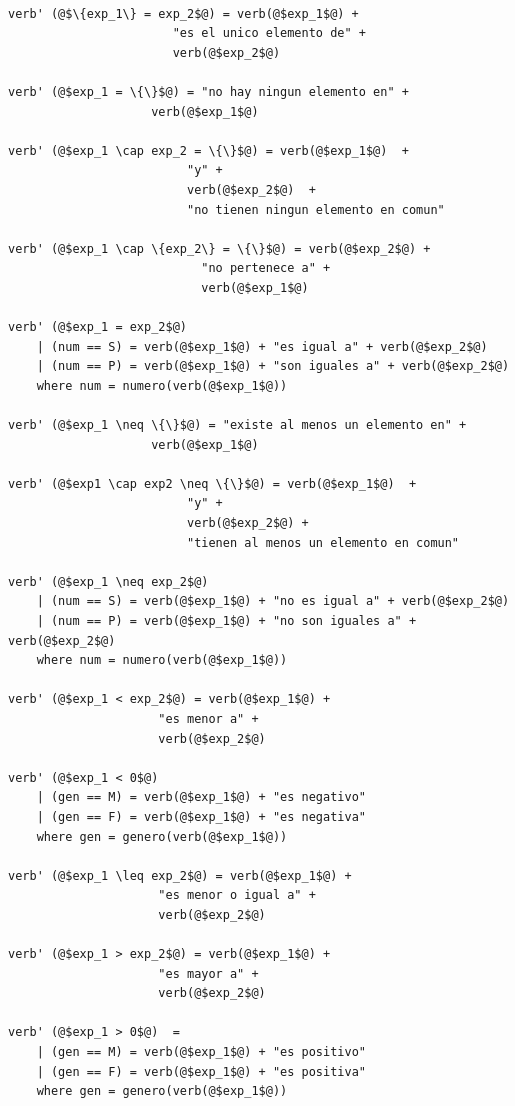 \begin{mdframed}[style=codebox]
\begin{verbatim}

verb' (@$\{exp_1\} = exp_2$@) = verb(@$exp_1$@) + 
                       "es el unico elemento de" + 
                       verb(@$exp_2$@)

verb' (@$exp_1 = \{\}$@) = "no hay ningun elemento en" + 
                    verb(@$exp_1$@) 

verb' (@$exp_1 \cap exp_2 = \{\}$@) = verb(@$exp_1$@)  +  
                         "y" +  
                         verb(@$exp_2$@)  +  
                         "no tienen ningun elemento en comun"

verb' (@$exp_1 \cap \{exp_2\} = \{\}$@) = verb(@$exp_2$@) +  
                           "no pertenece a" +  
                           verb(@$exp_1$@) 

verb' (@$exp_1 = exp_2$@)
    | (num == S) = verb(@$exp_1$@) + "es igual a" + verb(@$exp_2$@) 
    | (num == P) = verb(@$exp_1$@) + "son iguales a" + verb(@$exp_2$@) 
    where num = numero(verb(@$exp_1$@))

verb' (@$exp_1 \neq \{\}$@) = "existe al menos un elemento en" +  
                    verb(@$exp_1$@) 

verb' (@$exp1 \cap exp2 \neq \{\}$@) = verb(@$exp_1$@)  +  
                         "y" +  
                         verb(@$exp_2$@) +  
                         "tienen al menos un elemento en comun" 

verb' (@$exp_1 \neq exp_2$@)
    | (num == S) = verb(@$exp_1$@) + "no es igual a" + verb(@$exp_2$@) 
    | (num == P) = verb(@$exp_1$@) + "no son iguales a" + verb(@$exp_2$@) 
    where num = numero(verb(@$exp_1$@))

verb' (@$exp_1 < exp_2$@) = verb(@$exp_1$@) +  
                     "es menor a" +  
                     verb(@$exp_2$@) 

verb' (@$exp_1 < 0$@)
    | (gen == M) = verb(@$exp_1$@) + "es negativo" 
    | (gen == F) = verb(@$exp_1$@) + "es negativa" 
    where gen = genero(verb(@$exp_1$@))
                                 
verb' (@$exp_1 \leq exp_2$@) = verb(@$exp_1$@) +  
                     "es menor o igual a" +  
                     verb(@$exp_2$@) 

verb' (@$exp_1 > exp_2$@) = verb(@$exp_1$@) +  
                     "es mayor a" +  
                     verb(@$exp_2$@) 

verb' (@$exp_1 > 0$@)  =
    | (gen == M) = verb(@$exp_1$@) + "es positivo" 
    | (gen == F) = verb(@$exp_1$@) + "es positiva" 
    where gen = genero(verb(@$exp_1$@))


\end{verbatim}
\end{mdframed}
